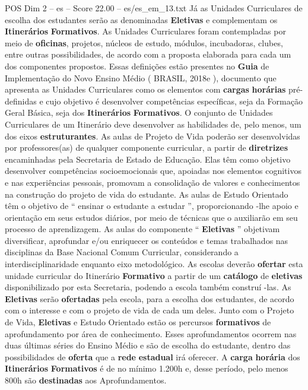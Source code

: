 \begin{textsample}{POS Dim 2 – es – Score 22.00 – es/es\_em\_13.txt}
Já as Unidades Curriculares de escolha dos estudantes serão as denominadas \textbf{Eletivas} e complementam os \textbf{Itinerários} \textbf{Formativos}.
As Unidades Curriculares foram contempladas por meio de \textbf{oficinas}, projetos, núcleos de estudo, módulos, incubadoras, clubes, entre outras possibilidades, de acordo com a proposta elaborada para cada um dos componentes propostos.
Essas definições estão presentes no \textbf{Guia} de Implementação do Novo Ensino Médio ( BRASIL, 2018e ), documento que apresenta as Unidades Curriculares como os elementos com \textbf{cargas} \textbf{horárias} pré-definidas e cujo objetivo é desenvolver competências específicas, seja da Formação Geral Básica, seja dos \textbf{Itinerários} \textbf{Formativos}.
O conjunto de Unidades Curriculares de um Itinerário deve desenvolver as habilidades de, pelo menos, um dos eixos \textbf{estruturantes}.
As aulas de Projeto de Vida poderão ser desenvolvidas por professores(as) de qualquer componente curricular, a partir de \textbf{diretrizes} encaminhadas pela Secretaria de Estado de Educação.
Elas têm como objetivo desenvolver competências socioemocionais que, apoiadas nos elementos cognitivos e nas experiências pessoais, promovam a consolidação de valores e conhecimentos na construção do projeto de vida do estudante.
As aulas de Estudo Orientado têm o objetivo de “ ensinar o estudante a estudar ”, proporcionando -lhe apoio e orientação em seus estudos diários, por meio de técnicas que o auxiliarão em seu processo de aprendizagem.
As aulas do componente “ \textbf{Eletivas} ” objetivam diversificar, aprofundar e/ou enriquecer os conteúdos e temas trabalhados nas disciplinas da Base Nacional Comum Curricular, considerando a interdisciplinaridade enquanto eixo metodológico.
As escolas deverão \textbf{ofertar} esta unidade curricular do Itinerário \textbf{Formativo} a partir de um \textbf{catálogo} de \textbf{eletivas} disponibilizado por esta Secretaria, podendo a escola também construí -las.
As \textbf{Eletivas} serão \textbf{ofertadas} pela escola, para a escolha dos estudantes, de acordo com o interesse e com o projeto de vida de cada um deles.
Junto com o Projeto de Vida, \textbf{Eletivas} e Estudo Orientado estão os percursos \textbf{formativos} de aprofundamento por área de conhecimento.
Esses aprofundamentos ocorrem nas duas últimas séries do Ensino Médio e são de escolha do estudante, dentro das possibilidades de \textbf{oferta} que a \textbf{rede} \textbf{estadual} irá oferecer.
A \textbf{carga} \textbf{horária} dos \textbf{Itinerários} \textbf{Formativos} é de no mínimo 1.200h e, desse período, pelo menos 800h são \textbf{destinadas} aos Aprofundamentos.

\end{textsample}
